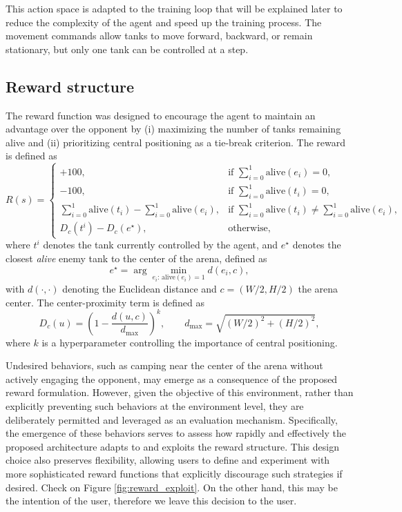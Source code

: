 \documentclass[conf]{new-aiaa}
\begin{document}
This action space is adapted to the training loop that will be explained later to reduce the complexity of the agent and speed up the training process. The movement commands allow tanks to move forward, backward, or remain stationary, but only one tank can be controlled at a step. 

\subsection{Reward structure}

The reward function was designed to encourage the agent to maintain an advantage over the opponent by (i) maximizing the number of tanks remaining alive and (ii) prioritizing central positioning as a tie-break criterion. The reward is defined as
\[
R(s)=
\begin{cases}
\displaystyle +100,
& \text{if } \sum_{i=0}^{1} \text{alive}(e_i) = 0, \\[6pt]

\displaystyle -100,
& \text{if } \sum_{i=0}^{1} \text{alive}(t_i) = 0, \\[6pt]

\displaystyle \sum_{i=0}^{1} \text{alive}(t_i) - \sum_{i=0}^{1} \text{alive}(e_i),
& \text{if } \sum_{i=0}^{1} \text{alive}(t_i) \neq \sum_{i=0}^{1} \text{alive}(e_i), \\[8pt]

\displaystyle D_c(t^i) - D_c(e^\star),
& \text{otherwise},
\end{cases}
\]
where $t^i$ denotes the tank currently controlled by the agent, and $e^\star$ denotes the closest \emph{alive} enemy tank to the center of the arena, defined as
\[
e^\star = \arg\min_{e_i:\,\text{alive}(e_i)=1} d(e_i,c),
\]
with $d(\cdot,\cdot)$ denoting the Euclidean distance and $c=(W/2,H/2)$ the arena center. The center-proximity term is defined as
\[
D_c(u)=\left(1-\frac{d(u,c)}{d_{\max}}\right)^k,
\qquad
d_{\max}=\sqrt{(W/2)^2+(H/2)^2},
\]
where $k$ is a hyperparameter controlling the importance of central positioning.

Undesired behaviors, such as camping near the center of the arena without actively engaging the opponent, may emerge as a consequence of the proposed reward formulation. However, given the objective of this environment, rather than explicitly preventing such behaviors at the environment level, they are deliberately permitted and leveraged as an evaluation mechanism. Specifically, the emergence of these behaviors serves to assess how rapidly and effectively the proposed architecture adapts to and exploits the reward structure. This design choice also preserves flexibility, allowing users to define and experiment with more sophisticated reward functions that explicitly discourage such strategies if desired. Check on Figure \ref{fig:reward_exploit}. On the other hand, this may be the intention of the user, therefore we leave this decision to the user.
\end{document}
